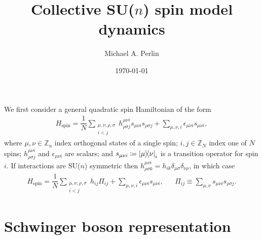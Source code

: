 \documentclass[nofootinbib,notitlepage,11pt]{revtex4-2}
\renewcommand{\t}{\text} %
\newcommand{\f}[2]{\dfrac{#1}{#2}} %
\renewcommand{\i}{\mathrm{i}\mkern1mu} %
\newcommand{\1}{\mathds{1}}
\newcommand{\ZZ}{\mathbb{Z}}
\begin{document}
\thispagestyle{fancy}


\title{Collective SU($n$) spin model dynamics}%
\author{Michael A. Perlin}%
\date{\today}

\maketitle

We first consider a general quadratic spin Hamiltonian of the form
\begin{align}
  H_{\t{spin}} = \f1N \sum_{\substack{\mu,\nu,\rho,\sigma\\i<j}}
  h^{\mu\nu i}_{\rho\sigma j} s_{\mu\nu i} s_{\rho\sigma j}
  + \sum_{\mu,\nu,i} \epsilon_{\mu\nu i} s_{\mu\nu i},
  \label{eq:spin}
\end{align}
where $\mu,\nu\in\ZZ_n$ index orthogonal states of a single spin;
$i,j\in\ZZ_N$ index one of $N$ spins; $h^{\mu\nu i}_{\rho\sigma j}$
and $\epsilon_{\mu\nu i}$ are scalars; and
$s_{\mu\nu i}\coloneqq\op{\mu}{\nu}_i$ is a transition operator for
spin $i$.  If interactions are SU($n$) symmetric then
$h^{\mu\nu i}_{\rho\sigma k} = h_{ik}
\delta_{\mu\sigma}\delta_{\nu\rho}$, in which case
\begin{align}
  H_{\t{spin}} = \f1N \sum_{\substack{\mu,\nu,\rho,\sigma\\i<j}}
  h_{ij} \Pi_{ij}
  + \sum_{\mu,\nu,i} \epsilon_{\mu\nu i} s_{\mu\nu i},
  &&
  \Pi_{ij} \equiv \sum_{\mu,\nu} s_{\mu\nu i} s_{\rho\sigma j}.
  \label{eq:spin_sun}
\end{align}

\section{Schwinger boson representation}
\end{document}
